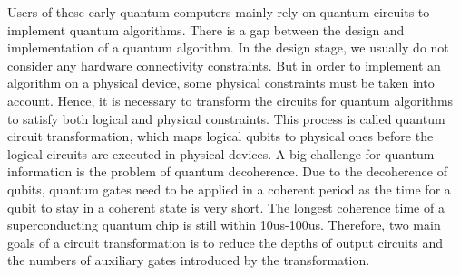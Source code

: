 \documentclass[journal]{IEEEtran}
\begin{document}
Users of these early quantum computers mainly rely on quantum circuits to implement quantum algorithms.
There is a gap between the design and implementation of a quantum algorithm. In the design stage, we usually do not consider any hardware connectivity constraints. But in order to implement an algorithm on a physical device, some physical constraints must be taken into account. Hence, it is necessary to transform the circuits for quantum algorithms to satisfy both logical and physical constraints. This process is called quantum circuit transformation, which maps logical qubits to physical ones before the logical circuits are executed in physical devices. A big challenge for quantum information is the problem of quantum decoherence. Due to the decoherence of qubits, quantum gates need to be applied in a coherent period as the time for a qubit to stay in a coherent state is very short. The longest coherence time of a superconducting quantum chip is still within 10us-100us. 
Therefore, two main goals of a circuit transformation is to reduce the depths of output circuits and the numbers of auxiliary gates introduced by the transformation.  


\end{document}

